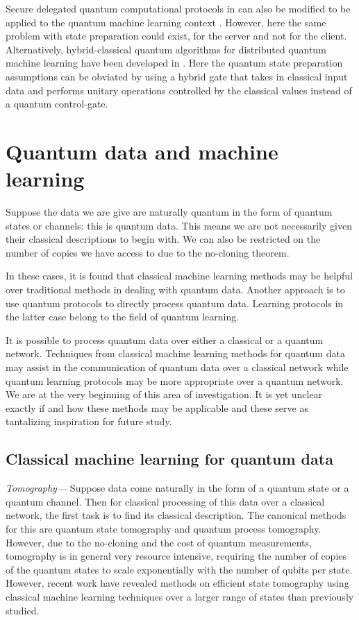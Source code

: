 \documentclass[twocolumn, aps, rmp, amsmath, amssymb, nofootinbib, superscriptaddress, longbibliography, floatfix, table-of-contents, eqsecnum]{revtex4-2}
\begin{document}
Secure delegated quantum computational protocols in \cite{joe} can also be modified to be applied to the quantum machine learning context \cite{sheng2017distributed, bang2015protocol}. However, here the same problem with state preparation could exist, for the server and not for the client. Alternatively, hybrid-classical quantum algorithms for distributed quantum machine learning have been developed in \cite{yoo2014quantum}. Here the quantum state preparation assumptions can be obviated by using a hybrid gate that takes in classical input data and performs unitary operations controlled by the classical values instead of a quantum control-gate.
\section{Quantum data and machine learning} \label{sec:sec4}
Suppose the data we are give are naturally quantum in the form of quantum states or channels: this is quantum data. This means we are not necessarily given their classical descriptions to begin with. We can also be restricted on the number of copies we have access to due to the no-cloning theorem.

In these cases, it is found that classical machine learning methods may be helpful over traditional methods in dealing with quantum data. Another approach is to use quantum protocols to directly process quantum data. Learning protocols in the latter case belong to the field of quantum learning.

It is possible to process quantum data over either a classical or a quantum network. Techniques from classical machine learning methods for quantum data may assist in the communication of quantum data over a classical network while quantum learning protocols may be more appropriate over a quantum network. We are at the very beginning of this area of investigation. It is yet unclear exactly if and how these methods may be applicable and these serve as tantalizing inspiration for future study.

\subsection{Classical machine learning for quantum data}
\textit{Tomography---} Suppose data come naturally in the form of a quantum state or a quantum channel. Then for classical processing of this data over a classical network, the first task is to find its classical description. The canonical methods for this are quantum state tomography and quantum process tomography. However, due to the no-cloning and the cost of quantum measurements, tomography is in general very resource intensive, requiring the number of copies of the quantum states to scale exponentially with the number of qubits per state. However, recent work have revealed methods on efficient state tomography using classical machine learning techniques \cite{Torlai2017, Han2017} over a larger range of states than previously studied.
\end{document}
